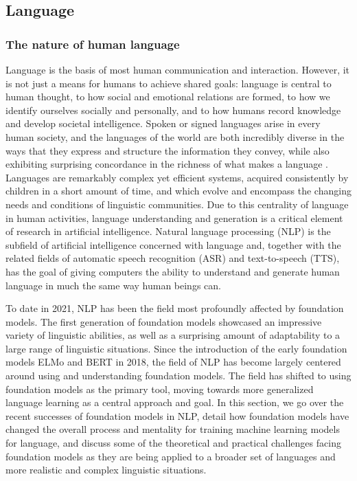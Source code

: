 \newsection
\subsection{Language}
\label{sec:language}

\subsubsection{The nature of human language}

Language is the basis of most human communication and interaction. However, it is not just a means for humans to achieve shared goals: language is central to human thought, to how social and emotional relations are formed, to how we identify ourselves socially and personally, and to how humans record knowledge and develop societal intelligence.
Spoken or signed languages arise in every human society, and the languages of the world are both incredibly diverse in the ways that they express and structure the information they convey, while also exhibiting surprising concordance in the richness of what makes a language \citep{comrie1989language}.
Languages are remarkably complex yet efficient systems, acquired consistently by children in a short amount of time, and which evolve and encompass the changing needs and conditions of linguistic communities. 
Due to this centrality of language in human activities, language understanding and generation is a critical element of research in artificial intelligence. 
Natural language processing (NLP) is the subfield of artificial intelligence concerned with language and, together with the related fields of automatic speech recognition (ASR) and text-to-speech (TTS), has the goal of giving computers the ability to understand and generate human language in much the same way human beings can. 

To date in 2021, NLP has been the field most profoundly affected by foundation models. The first generation of foundation models showcased an impressive variety of linguistic abilities, as well as a surprising amount of adaptability to a large range of linguistic situations. Since the introduction of the early foundation models ELMo \cite{peters2018elmo} and BERT \cite{devlin2019bert} in 2018, the field of NLP has become largely centered around using and understanding foundation models.
The field has shifted to using foundation models as the primary tool, moving towards more generalized language learning as a central approach and goal. 
In this section, we go over the recent successes of foundation models in NLP, detail how foundation models have changed the overall process and mentality for training machine learning models for language, and discuss some of the theoretical and practical challenges facing foundation models as they are being applied to a broader set of languages and more realistic and complex linguistic situations.

